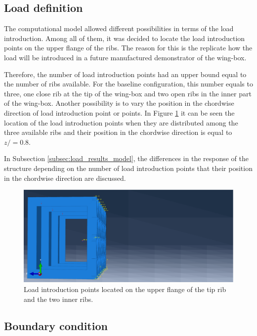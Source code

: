   \clearpage
  \subsection{Load definition} \label{subsec:load_computationalModel}

    The computational model allowed different possibilities in terms of the load introduction. Among all of them, it was decided to locate the load introduction points on the upper flange of the ribs. The reason for this is the replicate how the load will be introduced in a future manufactured demonstrator of the wing-box.

    Therefore, the number of load introduction points had an upper bound equal to the number of ribs available. For the baseline configuration, this number equals to three, one close rib at the tip of the wing-box and two open ribs in the inner part of the wing-box. Another possibility is to vary the position in the chordwise direction of load introduction point or points. In Figure \ref{fig:loadIntroductionPoints} it can be seen the location of the load introduction points when they are distributed among the three available ribs and their position in the chordwise direction is equal to $z / = 0.8 $.

    In Subsection \ref{subsec:load_results_model}, the differences in the response of the structure depending on the number of load introduction points that their position in the chordwise direction are discussed.

    \begin{figure}[!htpb]
      \centering
      \includegraphics[width=0.6 \textwidth]{figures/../figures/model/loadIntroductionPoints}
      \caption[Load introduction points located on the upper flange of the tip rib and the two inner ribs]{Load introduction points located on the upper flange of the tip rib and the two inner ribs.}
      \label{fig:loadIntroductionPoints}
    \end{figure}

  \subsection{Boundary condition} \label{subsec:boundary_computationalModel}

